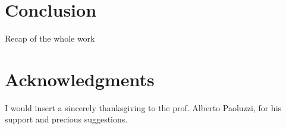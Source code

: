 \documentclass{sigchi}
\begin{document}


\section{Conclusion}  %
\label{sec:conclusion}

Recap of the whole work



\section{Acknowledgments}  %
\label{sec:acknowledgments}

I would insert a sincerely thanksgiving to the prof. Alberto Paoluzzi, for his support and precious suggestions.


%
%
%
%
%
\balance



\end{document}
